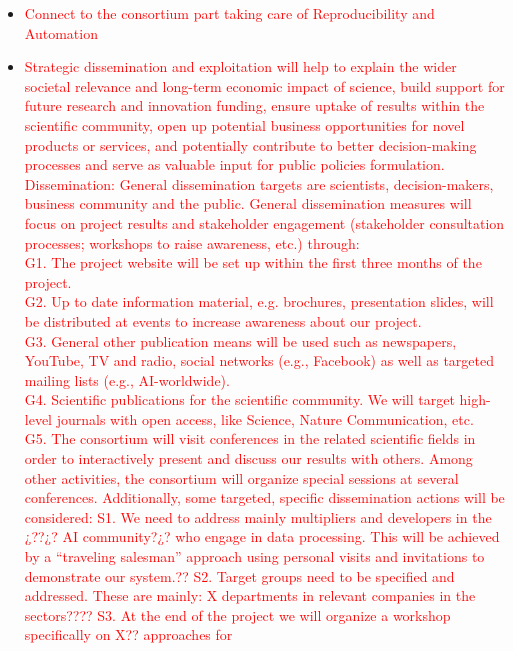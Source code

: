 \documentclass[11pt, a4paper]{article} %
\begin{document}
{\begin{itemize}
\item \textcolor{red}{Connect to the consortium part taking care of Reproducibility and Automation}
\item \textcolor{red}{Strategic dissemination and exploitation will help to
  explain the wider societal relevance and long-term economic impact
  of science, build support for future research and innovation
  funding, ensure uptake of results within the scientific community,
  open up potential business opportunities for novel products or
  services, and potentially contribute to better decision-making
  processes and serve as valuable input for public policies
  formulation.  Dissemination: General dissemination targets are
  scientists, decision-makers, business community and the public.
  General dissemination measures will focus on project results and
  stakeholder engagement (stakeholder consultation processes;
  workshops to raise awareness, etc.) through:
  \\
  G1. The project website will be set up within the first three months
  of the project.
  \\
  G2. Up to date information material, e.g. brochures, presentation
  slides, will be distributed at events to increase awareness about
  our project.
  \\
  G3. General other publication means will be used such as newspapers,
  YouTube, TV and radio, social networks (e.g., Facebook) as well as
  targeted mailing lists (e.g., AI-worldwide).
  \\
  G4. Scientific publications for the scientific community. We will
  target high-level journals with open access, like Science, Nature
  Communication, etc.
  \\
  G5. The consortium will visit conferences in the related scientific
  fields in order to interactively present and discuss our results
  with others. Among other activities, the consortium will organize
  special sessions at several conferences.  Additionally, some
  targeted, specific dissemination actions will be considered: S1. We
  need to address mainly multipliers and developers in the ¿??¿? AI
  community?¿?  who engage in data processing. This will be achieved
  by a “traveling salesman” approach using personal visits and
  invitations to demonstrate our system.??  S2. Target groups need to
  be specified and addressed.  These are mainly: X departments in
  relevant companies in the sectors????  S3. At the end of the project
  we will organize a workshop specifically on X?? approaches for
}
\end{itemize}}
\end{document}
